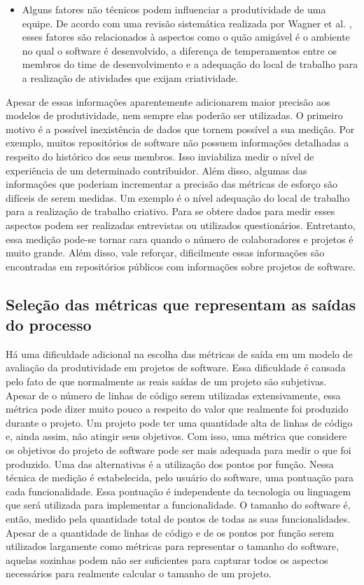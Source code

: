 \begin{itemize}
\item Alguns fatores não técnicos podem influenciar a produtividade de uma equipe. De acordo com uma revisão sistemática realizada por Wagner et al. \cite{wagner2018systematic}, esses fatores são relacionados à aspectos como o quão amigável é o ambiente no qual o software é desenvolvido, a diferença de temperamentos entre os membros do time de desenvolvimento e a adequação do local de trabalho para a realização de atividades que exijam criatividade.


\end{itemize}


Apesar de essas informações aparentemente adicionarem maior precisão aos modelos de produtividade, nem sempre elas poderão ser utilizadas. O primeiro motivo é a possível inexistência de dados que tornem possível a sua medição. Por exemplo, muitos repositórios de software não possuem informações detalhadas a respeito do histórico dos seus membros. Isso inviabiliza medir o nível de experiência de um determinado contribuidor. Além disso, algumas das informações que poderiam incrementar a precisão das métricas de esforço são difíceis de serem medidas. Um exemplo é o nível  adequação do local de trabalho  para a realização de trabalho criativo. Para se obtere dados para medir esses aspectos podem ser realizadas entrevistas ou utilizados questionários. Entretanto, essa medição pode-se tornar cara quando o número de colaboradores e projetos é muito grande. Além disso, vale reforçar, dificilmente essas informações são encontradas em repositórios públicos com informações sobre projetos de software.

\subsection{Seleção das métricas que representam as saídas do processo}
\label{modelo_concreto_saidas}

Há uma dificuldade adicional na escolha das métricas de saída em um modelo de avaliação da produtividade em projetos de software. Essa dificuldade é causada pelo fato de que normalmente as reais saídas de um projeto são subjetivas. Apesar de o número de linhas de código serem utilizadas extensivamente, essa métrica pode dizer muito pouco a respeito do valor que realmente foi produzido durante o projeto. Um projeto pode ter uma quantidade alta de linhas de código e, ainda assim, não atingir seus objetivos. Com isso, uma métrica que considere os objetivos do projeto de software pode ser mais adequada para medir o que foi produzido. Uma das alternativas é a utilização dos pontos por função. Nessa técnica de medição é estabelecida, pelo usuário do software, uma pontuação para cada funcionalidade. Essa pontuação é independente da tecnologia ou linguagem que será utilizada para implementar a funcionalidade. O tamanho do software é, então, medido pela quantidade total de pontos de todas as suas funcionalidades\cite{jeffery1997function}. Apesar de a quantidade de linhas de código e de os pontos por função serem utilizados largamente como métricas para representar o tamanho do software, aquelas sozinhas podem não ser suficientes para capturar todos os aspectos necessários para realmente calcular o tamanho de um projeto. 

